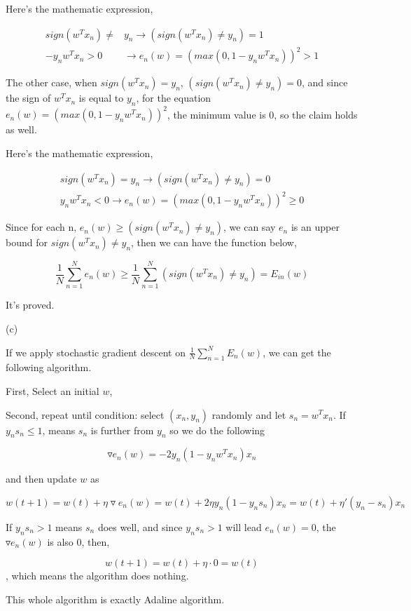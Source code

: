 \documentclass[11pt]{article}
\begin{document}
\begin{enumerate}
Here's the mathematic expression,

\begin{equation}
\begin{aligned}
sign(w^Tx_n) \neq& y_n \rightarrow \text{$(sign(w^Tx_n) \neq y_n) = 1$}\\
-y_nw^Tx_n > 0& \rightarrow \text{$e_n(w) = (max(0,1- y_nw^Tx_n))^2 > 1$}
\end{aligned}
\end{equation}

The other case, when $sign(w^Tx_n) = y_n$, $(sign(w^Tx_n) \neq y_n) = 0$, and since the sign of $w^Tx_n$ is equal to $y_n$, for the equation $e_n(w) = (max(0,1-y_nw^Tx_n))^2$, the minimum value is 0, so the claim holds as well.

Here's the mathematic expression, 

\begin{equation}
\begin{aligned}
sign(w^Tx_n) = y_n \rightarrow \text{$(sign(w^Tx_n) \neq y_n) = 0$}\\
y_nw^Tx_n < 0 \rightarrow \text{$e_n(w) = (max(0,1-y_nw^Tx_n))^2 \geq 0$}
\end{aligned}
\end{equation}

Since for each n, $e_n(w) \geq (sign(w^Tx_n) \neq y_n)$, we can say $e_n$ is an upper bound for $sign(w^Tx_n) \neq y_n$, then we can have the function below, 

$$\frac{1}{N}\sum_{n=1}^{N}e_n(w)\geq \frac{1}{N}\sum_{n=1}^{N}(sign(w^Tx_n)\neq y_n) = E_{in}(w)$$

It's proved.

(c)

If we apply stochastic gradient descent on $\frac{1}{N}\sum_{n=1}^{N}E_n(w)$, we can get the following algorithm.

First, Select an initial $w$, 

Second, repeat until condition: select $(x_n, y_n)$ randomly and let $s_n = w^Tx_n$. If $y_ns_n \leq 1$, means $s_n$ is further from $y_n$ so we do the following

$$\triangledown e_n(w) = -2y_n(1-y_nw^Tx_n)x_n$$

and then update $w$ as

$$w(t+1) = w(t) + \eta \triangledown e_n(w) = w(t) + 2\eta y_n(1-y_ns_n)x_n = w(t) + \eta'(y_n - s_n)x_n$$

If $y_ns_n > 1$ means $s_n$ does well, and since $y_ns_n > 1$ will lead $e_n(w) = 0$, the $\triangledown e_n(w)$ is also 0, then, 

$$w(t+1) = w(t) + \eta \cdot 0 = w(t)$$, which means the algorithm does nothing. 

This whole algorithm is exactly Adaline algorithm.



 
\end{enumerate}
\pagebreak
\end{document}

